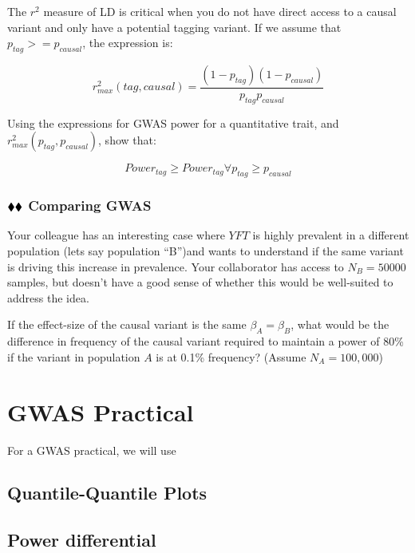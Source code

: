 \documentclass{pset}
\begin{document}
The $r^2$ measure of LD is critical when you do not have direct access to a causal variant and only have a potential tagging variant. If we assume that $p_{tag} >= p_{causal}$, the expression is: 

$$r^2_{max}(tag, causal) = \frac{(1 - p_{tag})(1 - p_{causal})}{p_{tag}p_{causal}}$$

Using the expressions for GWAS power for a quantitative trait, and $r^2_{max}(p_{tag}, p_{causal})$, show that:

$$Power_{tag} \geq Power_{tag} \forall p_{tag} \geq p_{causal}$$

\subsubsection*{$\mathbin{\blacklozenge}\mathbin{\blacklozenge}$ Comparing GWAS}

Your colleague has an interesting case where $YFT$ is highly prevalent in a different population (lets say population ``B'')and wants to understand if the same variant is driving this increase in prevalence. Your collaborator has access to $N_B=50000$ samples, but doesn't have a good sense of whether this would be well-suited to address the idea.

If the effect-size of the causal variant is the same $\beta_A = \beta_B$, what would be the difference in frequency of the causal variant required to maintain a power of 80\% if the variant in population $A$ is at 0.1\% frequency? (Assume $N_A = 100,000$)  


\section*{GWAS Practical}

For a GWAS practical, we will use 

\subsection*{Quantile-Quantile Plots}


\subsection*{Power differential}




\subsection*{}
\end{document}
